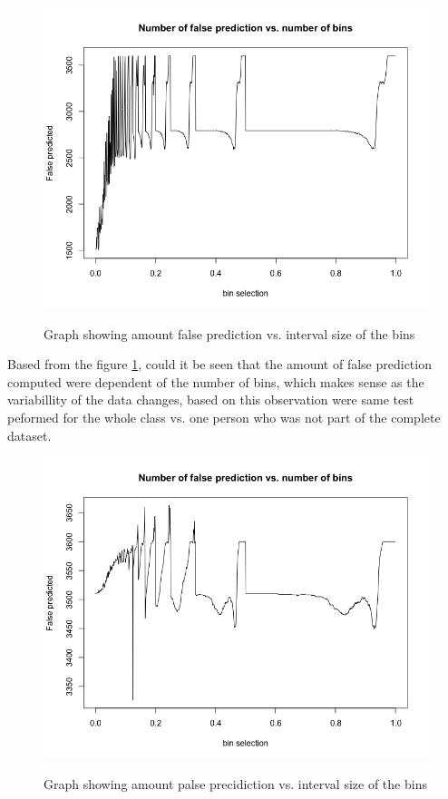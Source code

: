 \documentclass[10pt,a4paper]{article}
\begin{document}
\begin{figure}[H] 
\centering
\includegraphics[width = \textwidth]{number_of_false_prediction_vs_number_of_bins_plot.png}
\label{fig:false_g_g}
\caption{Graph showing amount false prediction vs. interval size of the bins}
\end{figure}

Based from the figure \ref{fig:false_g_g}, could it be seen that  the amount of false prediction computed were dependent of the number of bins, which makes sense as the variabillity of the data changes, based on this observation were same test peformed for the whole class vs. one person who was not part of the complete dataset. 

\begin{figure}[H]
\centering
\includegraphics[width = \textwidth]{g2M2vsFewer.png}
\label{fig:false_g_f}
\caption{Graph showing amount palse precidiction vs. interval size of the bins}
\end{figure}
\end{document}

